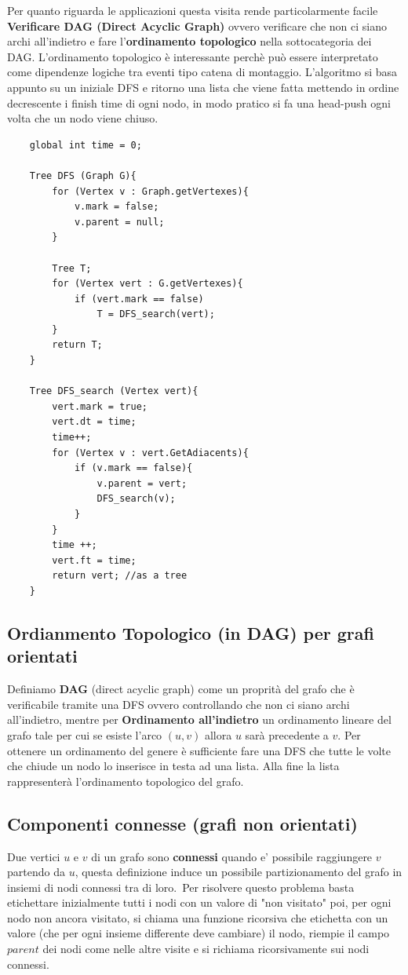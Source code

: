 \documentclass{article}
\begin{document}
Per quanto riguarda le applicazioni questa visita rende particolarmente facile \textbf{Verificare DAG (Direct Acyclic Graph)} ovvero verificare che non ci siano archi all'indietro e fare l'\textbf{ordinamento topologico} nella sottocategoria dei DAG.
L'ordinamento topologico è interessante perchè può essere interpretato come dipendenze logiche tra eventi tipo catena di montaggio. L'algoritmo si basa appunto su un iniziale DFS e ritorno una lista che viene fatta mettendo in ordine decrescente i finish time di ogni nodo, in modo pratico si fa una head-push ogni volta che un nodo viene chiuso.

\begin{verbatim}
    global int time = 0;

    Tree DFS (Graph G){
        for (Vertex v : Graph.getVertexes){
            v.mark = false;
            v.parent = null;
        }
        
        Tree T;
        for (Vertex vert : G.getVertexes){
            if (vert.mark == false)
                T = DFS_search(vert);
        }
        return T;
    }

    Tree DFS_search (Vertex vert){
        vert.mark = true;
        vert.dt = time;
        time++;
        for (Vertex v : vert.GetAdiacents){
            if (v.mark == false){
                v.parent = vert;
                DFS_search(v);
            }
        }
        time ++;
        vert.ft = time;
        return vert; //as a tree
    }

\end{verbatim}

\subsection{Ordianmento Topologico (in DAG) per grafi orientati}
Definiamo \textbf{DAG} (direct acyclic graph) come un proprità del grafo che è verificabile tramite una DFS ovvero controllando che non ci siano archi all'indietro, mentre per \textbf{Ordinamento all'indietro}
un ordinamento lineare del grafo tale per cui se esiste l'arco $(u,v)$ allora $u$ sarà precedente a $v$. Per ottenere un ordinamento del genere è sufficiente fare una DFS che tutte le volte che chiude un nodo lo inserisce in testa ad una lista.
Alla fine la lista rappresenterà l'ordinamento topologico del grafo.
\subsection{Componenti connesse (grafi non orientati)}
Due vertici $u$ e $v$ di un grafo sono \textbf{connessi} quando e' possibile raggiungere $v$ partendo da $u$, questa definizione induce un possibile partizionamento del grafo in insiemi di nodi connessi tra di loro.\
Per risolvere questo problema basta etichettare inizialmente tutti i nodi con un valore di "non visitato" poi, per ogni nodo non ancora visitato, si chiama una funzione ricorsiva che etichetta con un valore (che per ogni insieme differente deve cambiare) il nodo, riempie il campo $parent$ dei nodi come nelle altre visite e si richiama ricorsivamente sui nodi connessi.
\end{document}
